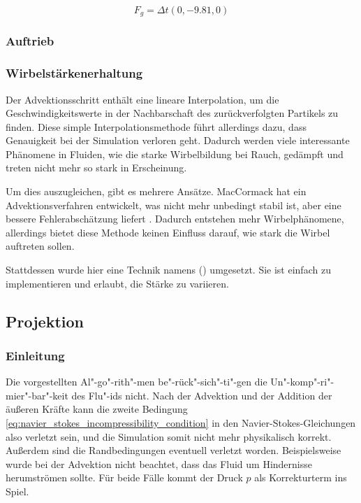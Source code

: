 \begin{equation}
F_g = \Delta t (0,-9.81,0)
\end{equation}

\subsubsection{Auftrieb}


\subsubsection{Wirbelstärkenerhaltung}

Der Advektionsschritt enthält eine lineare Interpolation, um die
Geschwindigkeitswerte in der Nachbarschaft des zurückverfolgten Partikels zu
finden. Diese simple Interpolationsmethode führt allerdings dazu, dass
Genauigkeit bei der Simulation verloren geht. Dadurch werden viele interessante
Phänomene in Fluiden, wie die starke Wirbelbildung bei Rauch, gedämpft und
treten nicht mehr so stark in Erscheinung.

Um dies auszugleichen, gibt es mehrere Ansätze. MacCormack hat ein
Advektionsverfahren entwickelt, was nicht mehr unbedingt stabil ist, aber eine
bessere Fehlerabschätzung liefert \cite{Selle2008}\cite{Crane2007}. Dadurch
entstehen mehr Wirbelphänomene, allerdings bietet diese Methode keinen Einfluss
darauf, wie stark die Wirbel auftreten sollen.

Stattdessen wurde hier eine Technik namens
 () umgesetzt. Sie ist einfach zu implementieren und erlaubt,
die Stärke zu variieren.

\subsection{Projektion}

\subsubsection{Einleitung}

Die vorgestellten Al"-go"-rith"-men be"-rück"-sich"-ti"-gen die
Un"-komp"-ri"-mier"-bar"-keit des Flu"-ids nicht. Nach der Advektion und der
Addition der äußeren Kräfte kann die zweite Bedingung
\ref{eq:navier_stokes_incompressibility_condition} in den
Navier-Stokes-Gleichungen also verletzt sein, und die Simulation somit nicht
mehr physikalisch korrekt. Außerdem sind die Randbedingungen eventuell verletzt
worden. Beispielsweise wurde bei der Advektion nicht beachtet, dass das Fluid um
Hindernisse herumströmen sollte. Für beide Fälle kommt der Druck $p$ als
Korrekturterm ins Spiel.

